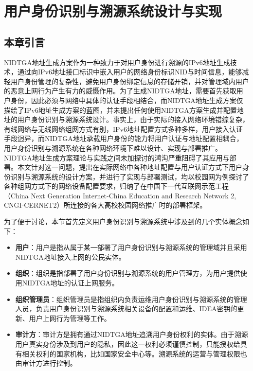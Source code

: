 
\chapter{用户身份识别与溯源系统设计与实现}
\label{NIDTGA}

  \section{本章引言}
  \label{NIDTGA:introduction}
  NIDTGA地址生成方案\cite{liu2015building}作为一种致力于对用户身份进行溯源的IPv6地址生成技术，通过向IPv6地址接口标识中嵌入用户的网络身份标识NID与时间信息，能够减轻用户身份管理的复杂性，避免用户身份绑定信息的存储开销，并对管理域内用户的恶意上网行为产生有力的威慑作用。为了生成NIDTGA地址，需要首先获取用户身份，因此必须与网络中具体的认证手段相结合，而NIDTGA地址生成方案仅描绘了IPv6地址生成方案的蓝图，并未提出任何使用NIDTGA方案生成并配置地址的用户身份识别与溯源系统设计。事实上，由于实际的接入网络环境错综复杂，有线网络与无线网络组网方式有别，IPv6地址配置方式多种多样，用户接入认证手段迥异，而NIDTGA地址承载用户身份的能力将用户认证与地址配置相耦合，用户身份识别与溯源系统在各种网络环境下难以设计、实现与部署推广。NIDTGA地址生成方案理论与实践之间未加探讨的鸿沟严重阻碍了其应用与部署。本文针对这一问题，提出在实际网络中各种地址配置与用户认证方式下用户身份识别与溯源系统的设计方案，并进行了实现与部署测试，均以校园网为例探讨了各种组网方式下的网络设备配置要求，归纳了在中国下一代互联网示范工程（China Next Generation Internet-China Education and Research Network 2, CNGI-CERNET2）所连接的各大高校校园网络推广时的部署框架。

  为了便于讨论，本节首先定义用户身份识别与溯源系统中涉及到的几个实体概念如下：
  \begin{itemize}
    \item \textbf{用户}：用户是指从属于某一部署了用户身份识别与溯源系统的管理域并且采用NIDTGA地址接入上网的公民实体。
    \item \textbf{组织}：组织是指部署了用户身份识别与溯源系统的用户管理方，为用户提供使用NIDTGA地址的认证上网服务。
    \item \textbf{组织管理员}：组织管理员是指组织内负责运维用户身份识别与溯源系统的管理人员，负责用户身份识别与溯源系统相关设备的配置和运维、IDEA密钥的更新、用户上网行为管理等工作。
    \item \textbf{审计方}：审计方是拥有通过NIDTGA地址追溯用户身份权利的实体。由于溯源用户真实身份涉及到用户的隐私，因此这一权利必须谨慎控制，只能授权给具有相关权利的国家机构，比如国家安全中心等。溯源系统的运营与管理权限也由审计方进行控制。
  \end{itemize}

